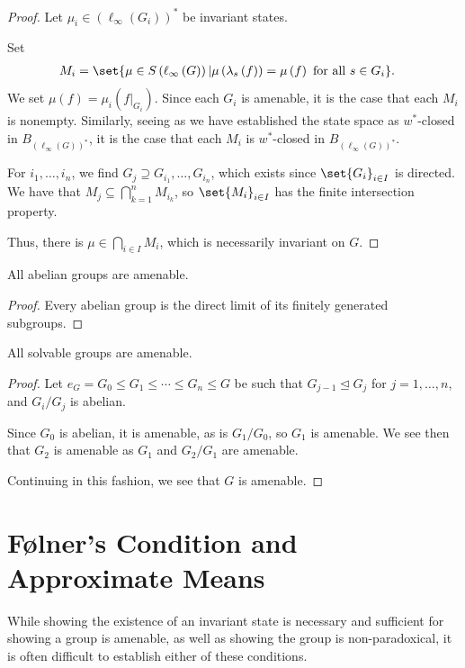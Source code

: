 \begin{proof}
  Let $\mu_i\in \left(\ell_{\infty}\left(G_i\right)\right)^{\ast}$ be invariant states.\newline

  Set
  \begin{align*}
    M_i &= \set{\mu\in S\left(\ell_{\infty}\left(G\right)\right)| \mu\left(\lambda_s\left(f\right)\right) = \mu\left(f\right)\text{ for all }s\in G_i}.
  \end{align*}
  We set $\mu\left(f\right) = \mu_i\left(f|_{G_i}\right)$. Since each $G_i$ is amenable, it is the case that each $M_i$ is nonempty. Similarly, seeing as we have established the state space as $w^{\ast}$-closed in $B_{\left(\ell_{\infty}\left(G\right)\right)^{\ast}}$, it is the case that each $M_i$ is $w^{\ast}$-closed in $B_{\left(\ell_{\infty}\left(G\right)\right)^{\ast}}$.\newline

  For $i_1,\dots,i_n$, we find $G_j \supseteq G_{i_1},\dots,G_{i_n}$, which exists since $\set{G_i}_{i\in I}$ is directed. We have that $M_j\subseteq \bigcap_{k=1}^{n}M_{i_k}$, so $\set{M_i}_{i\in I}$ has the finite intersection property.\newline

  Thus, there is $\mu\in \bigcap_{i\in I}M_i$, which is necessarily invariant on $G$.
\end{proof}
\begin{corollary}
  All abelian groups are amenable.
\end{corollary}
\begin{proof}
  Every abelian group is the direct limit of its finitely generated subgroups.
\end{proof}
\begin{corollary}
  All solvable groups are amenable.
\end{corollary}
\begin{proof}
  Let $e_G = G_0 \leq G_1\leq\cdots\leq G_n\leq G$ be such that $G_{j-1}\trianglelefteq G_j$ for $j=1,\dots,n$, and $G_i/G_j$ is abelian.\newline

  Since $G_0$ is abelian, it is amenable, as is $G_1/G_0$, so $G_1$ is amenable. We see then that $G_2$ is amenable as $G_1$ and $G_2/G_1$ are amenable.\newline

  Continuing in this fashion, we see that $G$ is amenable.
\end{proof}
\section{Følner's Condition and Approximate Means}%
While showing the existence of an invariant state is necessary and sufficient for showing a group is amenable, as well as showing the group is non-paradoxical, it is often difficult to establish either of these conditions.\newline


